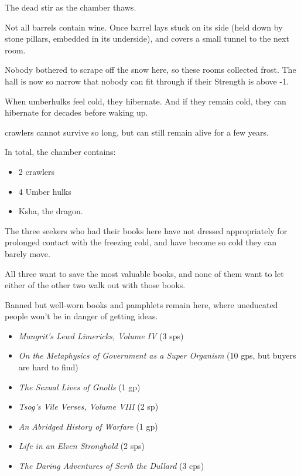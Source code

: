 \begin{multicols}{2}
The dead stir as the chamber thaws. 


Not all barrels contain wine.
Once barrel lays stuck on its side (held down by stone pillars, embedded in its underside), and covers a small tunnel to the next room.


Nobody bothered to scrape off the snow here, so these rooms collected frost.
The hall is now so narrow that nobody can fit through if their Strength is above -1.


When umberhulks feel cold, they hibernate.
And if they remain cold, they can hibernate for decades before waking up.

\Glspl{crawler} cannot survive so long, but can still remain alive for a few years.

In total, the chamber contains:

\begin{itemize}
  \item
  2 \glspl{crawler}
  \item
  4 Umber hulks
  \item
  Ksha, the dragon.
\end{itemize}


The three \glspl{seeker} who had their books here have not dressed appropriately for prolonged contact with the freezing cold, and have become so cold they can barely move.

All three want to save the most valuable books, and none of them want to let either of the other two walk out with those books.


Banned but well-worn books and pamphlets remain here, where uneducated people won't be in danger of getting ideas.

\begin{itemize}
  \item
  \textit{Mungrit's Lewd Limericks, Volume IV} (3 \glspl{sp})
  \item
  \textit{On the Metaphysics of Government as a Super Organism} (10 \glspl{gp}, but buyers are hard to find)
  \item
  \textit{The Sexual Lives of Gnolls} (1 \gls{gp})
  \item
  \textit{Tsog's Vile Verses, Volume VIII} (2 sp)
  \item
  \textit{An Abridged History of Warfare} (1 \gls{gp})
  \item
  \textit{Life in an Elven Stronghold} (2 \glspl{sp})
  \item
  \textit{The Daring Adventures of Scrib the Dullard} (3 \glspl{cp})
\end{itemize}

\end{multicols}

